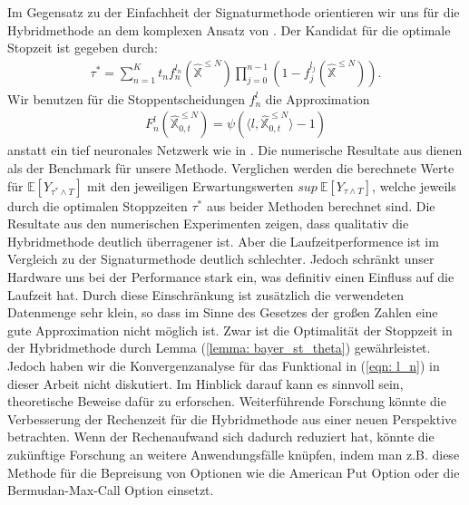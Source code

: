 \documentclass[12pt,titlepage,headsepline]{article}
\begin{document}
      \hfill\break
      Im Gegensatz zu der Einfachheit der Signaturmethode orientieren wir uns für die Hybridmethode an dem komplexen Ansatz von \cite{becker_deep_2019}. Der Kandidat für die optimale Stopzeit ist gegeben durch:
      \begin{align*}
        \tau^* = \sum_{n=1}^K t_nf_n^{l_n}(\hat{\mathbb{X}}^{\leq N})\prod_{j=0}^{n-1}(1-f_j^{l_j}(\hat{\mathbb{X}}^{\leq N})).
      \end{align*}
      Wir benutzen für die Stoppentscheidungen $f_n^l$ die Approximation
      \begin{align*}
        F_n^l(\hat{\mathbb{X}}_{0,t}^{\leq N}) = \psi(\langle l, \hat{\mathbb{X}}_{0,t}^{\leq N} \rangle - 1)
      \end{align*}
      anstatt ein tief neuronales Netzwerk wie in \cite{becker_deep_2019}.
      \hfill\break
      Die numerische Resultate aus \cite{becker_deep_2019} dienen als der Benchmark für unsere Methode. Verglichen werden die berechnete Werte für $\mathbb{E}[Y_{\tau^* \wedge T}]$ mit den jeweiligen Erwartungswerten $sup \ \mathbb{E}[Y_{\tau \wedge T}]$, welche jeweils durch die optimalen Stoppzeiten $\tau^*$ aus beider Methoden berechnet sind. Die Resultate aus den numerischen Experimenten zeigen, dass qualitativ die Hybridmethode deutlich überragener ist. Aber die Laufzeitperformence ist im Vergleich zu der Signaturmethode deutlich schlechter. Jedoch schränkt unser Hardware uns bei der Performance stark ein, was definitiv einen Einfluss auf die Laufzeit hat. Durch diese Einschränkung ist zusätzlich die verwendeten Datenmenge sehr klein, so dass im Sinne des Gesetzes der großen Zahlen eine gute Approximation nicht möglich ist.
      \hfill\break
      Zwar ist die Optimalität der Stoppzeit in der Hybridmethode durch Lemma (\ref{lemma: bayer_st_theta}) gewährleistet. Jedoch haben wir die Konvergenzanalyse für das Funktional in (\ref{eqn: l_n}) in dieser Arbeit nicht diskutiert. Im Hinblick darauf kann es sinnvoll sein, theoretische Beweise dafür zu erforschen. Weiterführende Forschung könnte die Verbesserung der Rechenzeit für die Hybridmethode aus einer neuen Perspektive betrachten. Wenn der Rechenaufwand sich dadurch reduziert hat, könnte die zukünftige Forschung an weitere Anwendungsfälle knüpfen, indem man z.B. diese Methode für die Bepreisung von Optionen wie die American Put Option oder die Bermudan-Max-Call Option einsetzt.
    \printbibliography

    \newpage

    \appendix
\end{document}
